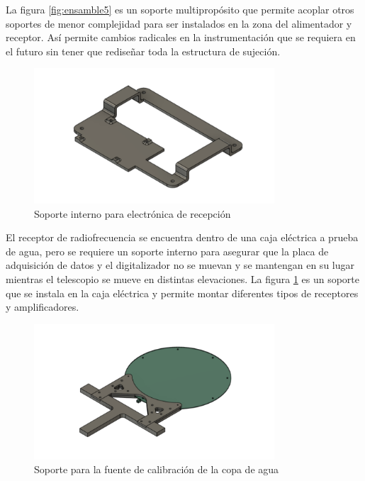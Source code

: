 La figura \ref{fig:ensamble5} es un soporte multipropósito que permite acoplar otros soportes de menor complejidad para ser instalados en la zona del alimentador y receptor. Así permite cambios radicales en la instrumentación que se requiera en el futuro sin tener que rediseñar toda la estructura de sujeción.\\

\begin{figure}
    \centering
    \includegraphics[width=0.8\textwidth]{img/soporte3D7}
    \caption{Soporte interno para electrónica de recepción}
    \label{fig:ensamble6}
\end{figure}

El receptor de radiofrecuencia se encuentra dentro de una caja eléctrica a prueba de agua, pero se requiere un soporte interno para asegurar que la placa de adquisición de datos y el digitalizador no se muevan y se mantengan en su lugar mientras el telescopio se mueve en distintas elevaciones. La figura \ref{fig:ensamble6} es un soporte que se instala en la caja eléctrica y permite montar diferentes tipos de receptores y amplificadores.\\

\begin{figure}
    \centering
    \includegraphics[width=0.8\textwidth]{img/soporte3D4}
    \caption{Soporte para la fuente de calibración de la copa de agua }
    \label{fig:ensamble7}
\end{figure}

